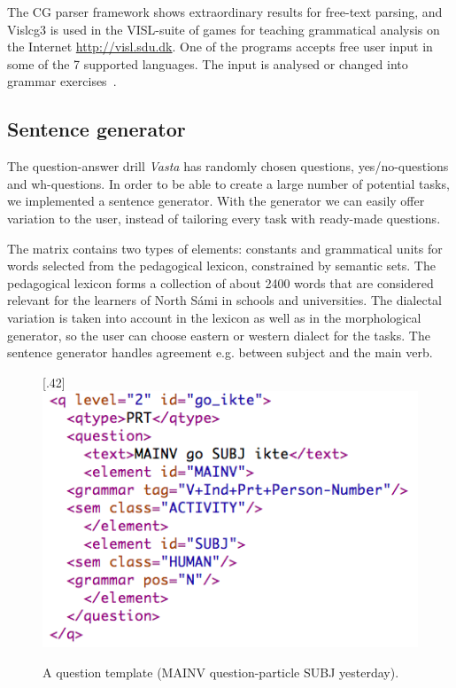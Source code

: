 \documentclass[11pt]{article}
\begin{document}
The CG parser framework shows extraordinary results for free-text parsing, and Vislcg3 is used in the VISL-suite of games for teaching grammatical analysis on the Internet \url{http://visl.sdu.dk}. One of the programs accepts free user input in some of the 7 supported languages. The input is analysed or changed into grammar exercises~\cite{Bick:05}.

\subsection{Sentence generator}
The question-answer drill \textit{Vasta} has randomly chosen questions, yes/no-questions and wh-questions. In order to be able to create a large number of potential tasks, we implemented a sentence generator. With the generator we can easily offer variation to the user, instead of tailoring every task with ready-made questions.

The matrix contains two types of elements: constants and grammatical units for words selected from the pedagogical lexicon, constrained by semantic sets. The pedagogical lexicon forms a collection of about 2400 words that are considered relevant for the learners of North Sámi in schools and universities. The dialectal variation is taken into account in the lexicon as well as in the morphological generator, so the user can choose eastern or western dialect for the tasks. The sentence generator handles agreement e.g. between subject and the main verb. 

\begin{figure}[htbp]
\begin{center}
\scalebox{.42}[.42]{\includegraphics{presentation/img/sentencegenerator.png}}\\
\caption{A question template (MAINV question-particle SUBJ yesterday).}
\label{sentgen}
\end{center}
\end{figure}
\end{document}
